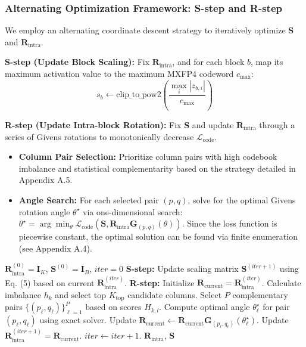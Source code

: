 \subsubsection{Alternating Optimization Framework: S-step and R-step}

We employ an alternating coordinate descent strategy to iteratively optimize $\mathbf{S}$ and $\mathbf{R}_{\text{intra}}$.

\textbf{S-step (Update Block Scaling):} Fix $\mathbf{R}_{\text{intra}}$, and for each block $b$, map its maximum activation value to the maximum MXFP4 codeword $c_{\max}$:
\begin{equation}
s_b \leftarrow \text{clip\_to\_pow2}\left( \frac{\max_i |z_{b,i}|}{c_{\max}} \right)
\end{equation}

\textbf{R-step (Update Intra-block Rotation):} Fix $\mathbf{S}$ and update $\mathbf{R}_{\text{intra}}$ through a series of Givens rotations to monotonically decrease $\mathcal{L}_{\text{code}}$.
\begin{itemize}
    \item \textbf{Column Pair Selection:} Prioritize column pairs with high codebook imbalance and statistical complementarity based on the strategy detailed in Appendix A.5.
    \item \textbf{Angle Search:} For each selected pair $(p, q)$, solve for the optimal Givens rotation angle $\theta^\star$ via one-dimensional search: $\theta^\star = \arg\min_{\theta} \mathcal{L}_{\text{code}}(\mathbf{S}, \mathbf{R}_{\text{intra}} \mathbf{G}_{(p,q)}(\theta))$. Since the loss function is piecewise constant, the optimal solution can be found via finite enumeration (see Appendix A.4).
\end{itemize}

\begin{algorithm}[tb]
   \caption{Intra-block Rotation Construction (Micro Codebook Equilibrium)}
   \label{alg:intra}
\begin{algorithmic}[1]
    $\mathbf{R}_{\text{intra}}^{(0)} = \mathbf{I}_K$, $\mathbf{S}^{(0)} = \mathbf{I}_B$, $iter=0$
       \STATE \textbf{S-step:} Update scaling matrix $\mathbf{S}^{(iter+1)}$ using Eq. (5) based on current $\mathbf{R}_{\text{intra}}^{(iter)}$.
       \STATE \textbf{R-step:} Initialize $\mathbf{R}_{\text{current}} = \mathbf{R}_{\text{intra}}^{(iter)}$.
       \STATE Calculate imbalance $h_k$ and select top $K_{\text{top}}$ candidate columns.
       \STATE Select $P$ complementary pairs $\{(p_\ell, q_\ell)\}_{\ell=1}^P$ based on scores $H_{k,l}$.
           \STATE Compute optimal angle $\theta_\ell^\star$ for pair $(p_\ell, q_\ell)$ using exact solver.
           \STATE Update $\mathbf{R}_{\text{current}} \leftarrow \mathbf{R}_{\text{current}} \mathbf{G}_{(p_\ell, q_\ell)}(\theta_\ell^\star)$.
       \ENDFOR
       \STATE Update $\mathbf{R}_{\text{intra}}^{(iter+1)} = \mathbf{R}_{\text{current}}$.
       \STATE $iter \leftarrow iter + 1$.
   \ENDWHILE
    $\mathbf{R}_{\text{intra}}$, $\mathbf{S}$
\end{algorithmic}
\end{algorithm}